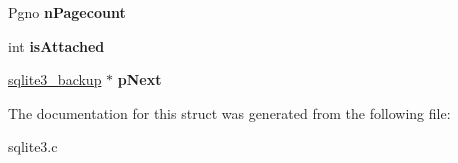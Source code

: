 \begin{DoxyCompactItemize}
\item 
\hypertarget{structsqlite3__backup_a98599d5a3a13173a6a126242d1fbbaa8}{Pgno {\bfseries n\-Pagecount}}\label{structsqlite3__backup_a98599d5a3a13173a6a126242d1fbbaa8}

\item 
\hypertarget{structsqlite3__backup_af515f0d9265847d820cbaad41cef78ae}{int {\bfseries is\-Attached}}\label{structsqlite3__backup_af515f0d9265847d820cbaad41cef78ae}

\item 
\hypertarget{structsqlite3__backup_a3a87332e045fe4a477fe262409c6011a}{\hyperlink{structsqlite3__backup}{sqlite3\-\_\-backup} $\ast$ {\bfseries p\-Next}}\label{structsqlite3__backup_a3a87332e045fe4a477fe262409c6011a}

\end{DoxyCompactItemize}


The documentation for this struct was generated from the following file\-:\begin{DoxyCompactItemize}
\item 
sqlite3.\-c\end{DoxyCompactItemize}
